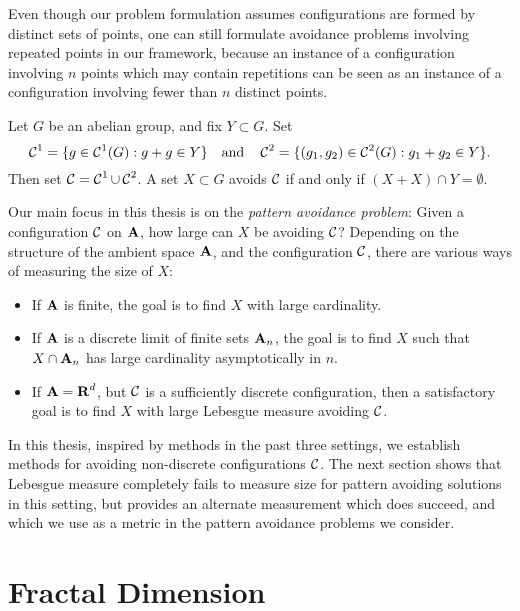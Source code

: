 Even though our problem formulation assumes configurations are formed by distinct sets of points, one can still formulate avoidance problems involving repeated points in our framework, because an instance of a configuration involving $n$ points which may contain repetitions can be seen as an instance of a configuration involving fewer than $n$ distinct points.

\begin{example}
	Let $G$ be an abelian group, and fix $Y \subset G$. Set
	\[ \operatorname{\mathcal{C}}^1 = \{ g \in \operatorname{\mathcal{C}}^1(G): g + g \in Y \} \quad \text{and} \quad \operatorname{\mathcal{C}}^2 = \{ (g_1,g_2) \in \operatorname{\mathcal{C}}^2(G): g_1 + g_2 \in Y \}. \]
	Then set $\operatorname{\mathcal{C}} = \operatorname{\mathcal{C}}^1 \cup \operatorname{\mathcal{C}}^2$. A set $X \subset G$ avoids $\operatorname{\mathcal{C}}$ if and only if $(X + X) \cap Y = \emptyset$.
\end{example}

Our main focus in this thesis is on the {\it pattern avoidance problem}: Given a configuration $\operatorname{\mathcal{C}}$ on $\operatorname{\mathbf{A}}$, how large can $X$ be avoiding $\operatorname{\mathcal{C}}$? Depending on the structure of the ambient space $\operatorname{\mathbf{A}}$, and the configuration $\operatorname{\mathcal{C}}$, there are various ways of measuring the size of $X$:
%
\begin{itemize}
	\item If $\operatorname{\mathbf{A}}$ is finite, the goal is to find $X$ with large cardinality.
	\item If $\operatorname{\mathbf{A}}$ is a discrete limit of finite sets $\operatorname{\mathbf{A}}_n$, the goal is to find $X$ such that $X \cap \operatorname{\mathbf{A}}_n$ has large cardinality asymptotically in $n$.
	\item If $\operatorname{\mathbf{A}} = \operatorname{\mathbf{R}}^d$, but $\operatorname{\mathcal{C}}$ is a sufficiently discrete configuration, then a satisfactory goal is to find $X$ with large Lebesgue measure avoiding $\operatorname{\mathcal{C}}$.
\end{itemize}
%
In this thesis, inspired by methods in the past three settings, we establish methods for avoiding non-discrete configurations $\operatorname{\mathcal{C}}$. The next section shows that Lebesgue measure completely fails to measure size for pattern avoiding solutions in this setting, but provides an alternate measurement which does succeed, and which we use as a metric in the pattern avoidance problems we consider.










\section{Fractal Dimension}

